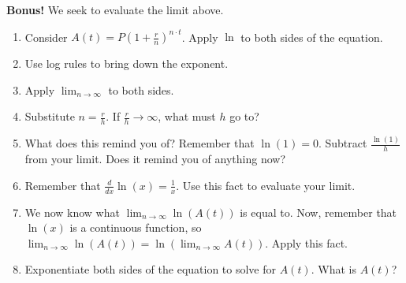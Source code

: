 \documentclass[12pt]{article}
\theoremstyle{mainstyle} %
\begin{document}
\begin{ex}
  \textbf{Bonus!} We seek to evaluate the limit above.
  \begin{enumerate}
  \item Consider \(A(t) = P \left( 1 + \frac{r}{n}
    \right)^{n \cdot t}\). Apply \(\ln\) to both sides of the
    equation.
    \vspace{1in}
  \item Use log rules to bring down the exponent.
    \vspace{1in}
  \item Apply \(\lim_{n \to \infty}\) to both sides.
    \vspace{1in}
  \item Substitute \(n = \frac{r}{h}\). If \(\frac{r}{h} \to \infty\),
    what must \(h\) go to?
    \vspace{1in}
  \item What does this remind you of? Remember that \(\ln(1) =
    0\). Subtract \(\frac{\ln(1)}{h}\) from your limit. Does it remind
    you of anything now?
    \vspace{1in}
  \item Remember that \(\frac{d}{dx} \ln(x) = \frac{1}{x}\). Use this
    fact to evaluate your limit.
        \vspace{1in}
  \item We now know what \(\lim_{n \to \infty} \ln(A(t))\) is equal
    to. Now, remember that \(\ln(x)\) is a continuous function, so
    \(\lim_{n \to \infty} \ln(A(t)) = \ln(\lim_{n\to\infty}
    A(t))\). Apply this fact.
        \vspace{1in}
  \item Exponentiate both sides of the equation to solve for \(A(t)\). What is \(A(t)\)?
  \end{enumerate}

\end{ex}
\end{document}

